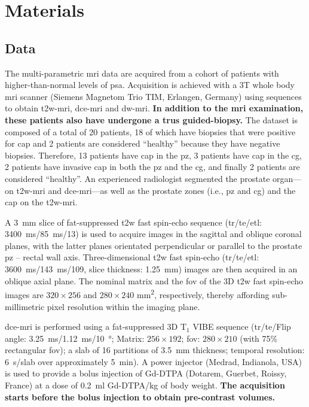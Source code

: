 \section{Materials}\label{sec:materials}

\subsection{Data}\label{sec:data}

The multi-parametric \ac{mri} data are acquired from a cohort of patients with higher-than-normal levels of \ac{psa}.
Acquisition is achieved with a 3T whole body \ac{mri} scanner (Siemens Magnetom Trio TIM, Erlangen, Germany) using sequences to obtain \ac{t2w}-\ac{mri}, \ac{dce}-\ac{mri} and \ac{dw}-\ac{mri}.
\textbf{In addition to the \ac{mri} examination, these patients also have
undergone a \ac{trus} guided-biopsy.}
The dataset is composed of a total of 20 patients, 18 of which have
biopsies that were positive for \ac{cap} and 2 patients are considered
``healthy'' because they have negative biopsies.
Therefore, 13 patients have \ac{cap} in the \ac{pz}, 3 patients have
\ac{cap} in the \ac{cg}, 2 patients have invasive \ac{cap} in both the
\ac{pz} and the \ac{cg}, and finally 2 patients are considered ``healthy''.
An experienced radiologist segmented the prostate organ---on
\ac{t2w}-\ac{mri} and \ac{dce}-\ac{mri}---as well as the prostate
zones (i.e., \ac{pz} and \ac{cg}) and the \ac{cap} on the \ac{t2w}-\ac{mri}.

A \SI{3}{\mm} slice of fat-suppressed \ac{t2w} fast spin-echo sequence
(\ac{tr}/\ac{te}/\ac{etl}: \SI{3400}{\ms}/\SI{85}{\ms}/13) is used to
acquire images in the sagittal and oblique coronal planes, with the latter planes orientated perpendicular or parallel to the prostate \ac{pz} – rectal wall axis.
Three-dimensional \ac{t2w} fast spin-echo (\ac{tr}/\ac{te}/\ac{etl}: \SI{3600}{\ms}/\SI{143}{\ms}/109, slice thickness: \SI{1.25}{\mm}) images are then acquired in an oblique axial plane.
The nominal matrix and the \ac{fov} of the 3D \ac{t2w} fast spin-echo images are $320 \times 256$ and $280 \times 240$ mm\textsuperscript{2}, respectively, thereby affording sub-millimetric pixel resolution within the imaging plane.

\ac{dce}-\ac{mri} is performed using a fat-suppressed 3D T$_1$ VIBE
sequence (\ac{tr}/\ac{te}/Flip angle:
\SI{3.25}{\ms}/\SI{1.12}{\ms}/\SI{10}{\degree}; Matrix: $256 \times
192$; \ac{fov}: $280 \times 210$ (with 75\% rectangular \ac{fov}); a slab of 16 partitions of \SI{3.5}{\mm} thickness; temporal resolution: \SI{6}{\s}/slab over approximately \SI{5}{\minute}).
A power injector (Medrad, Indianola, USA) is used to provide a bolus
injection of Gd-DTPA (Dotarem, Guerbet, Roissy, France) at a dose of
\SI{0.2}{\ml} Gd-DTPA/kg of body weight.
\textbf{The acquisition starts before the bolus injection to obtain
  pre-contrast volumes.}

